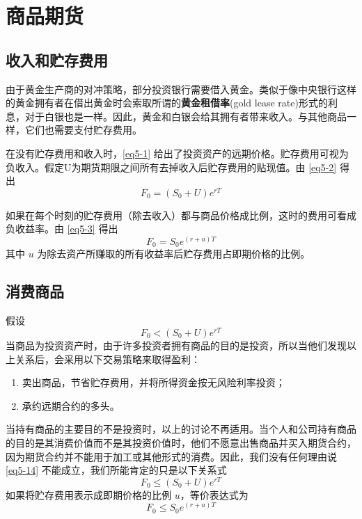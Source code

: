 \section{商品期货}
\subsection{收入和贮存费用}
由于黄金生产商的对冲策略，部分投资银行需要借入黄金。类似于像中央银行这样的黄金拥有者在借出黄金时会索取所谓的\textbf{黄金租借率}(gold lease rate)形式的利息，对于白银也是一样。因此，黄金和白银会给其拥有者带来收入。与其他商品一样，它们也需要支付贮存费用。

在没有贮存费用和收入时，\autoref{eq5-1} 给出了投资资产的远期价格。贮存费用可视为负收入。假定U为期货期限之间所有去掉收入后贮存费用的贴现值。由 \autoref{eq5-2} 得出
\begin{equation}\label{eq5-11}
    F_0=(S_0+U)e^{rT}
\end{equation}

如果在每个时刻的贮存费用（除去收入）都与商品价格成比例，这时的费用可看成负收益率。由 \autoref{eq5-3} 得出
\begin{equation}\label{eq5-12}
    F_0=S_0e^{(r+u)T}
\end{equation}
其中 $u$ 为除去资产所赚取的所有收益率后贮存费用占即期价格的比例。
\subsection{消费商品}
假设
\begin{equation}\label{eq5-14}
    F_0<(S_0+U)e^{rT}
\end{equation}
当商品为投资资产时，由于许多投资者拥有商品的目的是投资，所以当他们发现以上关系后，会采用以下交易策略来取得盈利：
\begin{enumerate}
    \item 卖出商品，节省贮存费用，并将所得资金按无风险利率投资；
    \item 承约远期合约的多头。
\end{enumerate}

当持有商品的主要目的不是投资时，以上的讨论不再适用。当个人和公司持有商品的目的是其消费价值而不是其投资价值时，他们不愿意出售商品并买入期货合约，因为期货合约并不能用于加工或其他形式的消费。因此，我们没有任何理由说 \autoref{eq5-14} 不能成立，我们所能肯定的只是以下关系式
\begin{equation}\label{eq5-15}
    F_0\leq (S_0+U)e^{rT}
\end{equation}
如果将贮存费用表示成即期价格的比例 $u$，等价表达式为
\begin{equation}\label{eq5-16}
    F_0\leq S_0e^{(r+u)T}
\end{equation}
